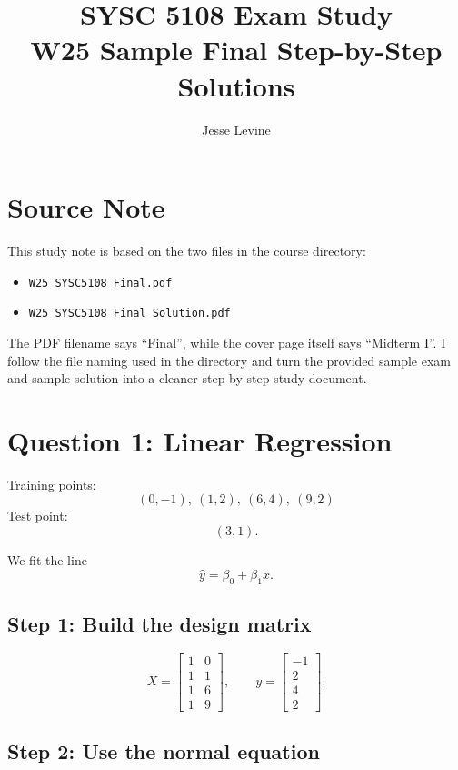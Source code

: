 \documentclass[11pt]{article}
\title{SYSC 5108 Exam Study\\W25 Sample Final Step-by-Step Solutions}
\author{Jesse Levine}
\date{}
\begin{document}
\maketitle

\section*{Source Note}

This study note is based on the two files in the course directory:
\begin{itemize}
    \item \texttt{W25\_SYSC5108\_Final.pdf}
    \item \texttt{W25\_SYSC5108\_Final\_Solution.pdf}
\end{itemize}

The PDF filename says ``Final'', while the cover page itself says ``Midterm I''.
I follow the file naming used in the directory and turn the provided sample exam
and sample solution into a cleaner step-by-step study document.

\section*{Question 1: Linear Regression}

Training points:
\[
    (0,-1),\ (1,2),\ (6,4),\ (9,2)
\]
Test point:
\[
    (3,1).
\]

We fit the line
\[
    \hat y = \beta_0 + \beta_1 x.
\]

\subsection*{Step 1: Build the design matrix}

\[
    X =
    \begin{bmatrix}
        1 & 0 \\
        1 & 1 \\
        1 & 6 \\
        1 & 9
    \end{bmatrix},
    \qquad
    y =
    \begin{bmatrix}
        -1 \\ 2 \\ 4 \\ 2
    \end{bmatrix}.
\]

\subsection*{Step 2: Use the normal equation}
\end{document}
